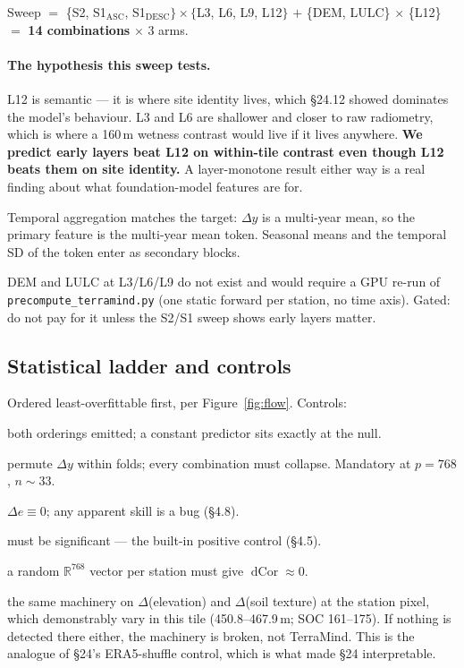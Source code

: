 \documentclass[11pt,a4paper]{article}
\newcommand{\dcor}{\operatorname{dCor}}
\newcommand{\R}{\mathbb{R}}
\begin{document}
Sweep $=$ \{S2, S1$_{\text{ASC}}$, S1$_{\text{DESC}}\} \times \{$L3, L6, L9, L12$\}$ $+$
\{DEM, LULC\} $\times$ \{L12\} $=$ \textbf{14 combinations} $\times$ 3 arms.

\paragraph{The hypothesis this sweep tests.} L12 is semantic --- it is where site identity
lives, which \S24.12 showed dominates the model's behaviour. L3 and L6 are shallower and
closer to raw radiometry, which is where a 160\,m wetness contrast would live if it lives
anywhere. \textbf{We predict early layers beat L12 on within-tile contrast even though
L12 beats them on site identity.} A layer-monotone result either way is a real finding
about what foundation-model features are for.

Temporal aggregation matches the target: $\Delta y$ is a multi-year mean, so the primary
feature is the multi-year mean token. Seasonal means and the temporal SD of the token
enter as secondary blocks.

DEM and LULC at L3/L6/L9 do not exist and would require a GPU re-run of
\verb|precompute_terramind.py| (one static forward per station, no time axis). Gated:
do not pay for it unless the S2/S1 sweep shows early layers matter.

\subsection{Statistical ladder and controls}

Ordered least-overfittable first, per Figure~\ref{fig:flow}. Controls:

\begin{description}[nosep,leftmargin=1.6em]
  \item[Antisymmetry] both orderings emitted; a constant predictor sits exactly at the null.
  \item[Label shuffle] permute $\Delta y$ within folds; every combination must collapse.
        Mandatory at $p=768$, $n\sim 33$.
  \item[Same-token pairs] $\Delta e \equiv 0$; any apparent skill is a bug (\S4.8).
  \item[Far bins] must be significant --- the built-in positive control (\S4.5).
  \item[Random vector] a random $\R^{768}$ vector per station must give $\dcor \approx 0$.
  \item[Independent positive control] the same machinery on $\Delta$(elevation) and
        $\Delta$(soil texture) at the station pixel, which demonstrably vary in this tile
        (450.8--467.9\,m; SOC 161--175). If nothing is detected there either, the machinery
        is broken, not TerraMind. This is the analogue of \S24's ERA5-shuffle control,
        which is what made \S24 interpretable.
\end{description}
\end{document}
